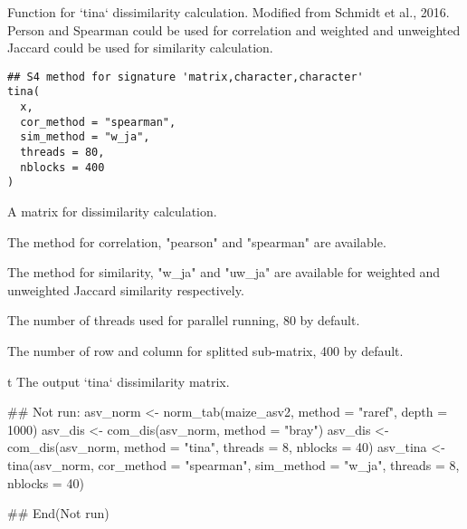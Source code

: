 \documentclass[a4paper]{book}
\begin{document}
%
\begin{Description}\relax
Function for `tina` dissimilarity calculation. Modified from Schmidt et al.,
2016. Person and Spearman could be used for correlation and weighted and
unweighted Jaccard could be used for similarity calculation.
\end{Description}
%
\begin{Usage}
\begin{verbatim}
## S4 method for signature 'matrix,character,character'
tina(
  x,
  cor_method = "spearman",
  sim_method = "w_ja",
  threads = 80,
  nblocks = 400
)
\end{verbatim}
\end{Usage}
%
\begin{Arguments}
\begin{ldescription}
\item[\code{x}] A matrix for dissimilarity calculation.

\item[\code{cor\_method}] The method for correlation, "pearson" and "spearman" are
available.

\item[\code{sim\_method}] The method for similarity, "w\_ja" and "uw\_ja" are
available for weighted and unweighted Jaccard similarity respectively.

\item[\code{threads}] The number of threads used for parallel running, 80 by
default.

\item[\code{nblocks}] The number of row and column for splitted sub-matrix, 400 by
default.
\end{ldescription}
\end{Arguments}
%
\begin{Value}
t The output `tina` dissimilarity matrix.
\end{Value}
%
\begin{Examples}
\begin{ExampleCode}
## Not run: 
asv_norm <- norm_tab(maize_asv2, method = "raref", depth = 1000)
asv_dis <- com_dis(asv_norm, method = "bray")
asv_dis <- com_dis(asv_norm, method = "tina", threads = 8, nblocks = 40)
asv_tina <- tina(asv_norm, cor_method = "spearman", sim_method = "w_ja",
threads = 8, nblocks = 40)

## End(Not run)
\end{ExampleCode}
\end{Examples}
\printindex{}
\end{document}
